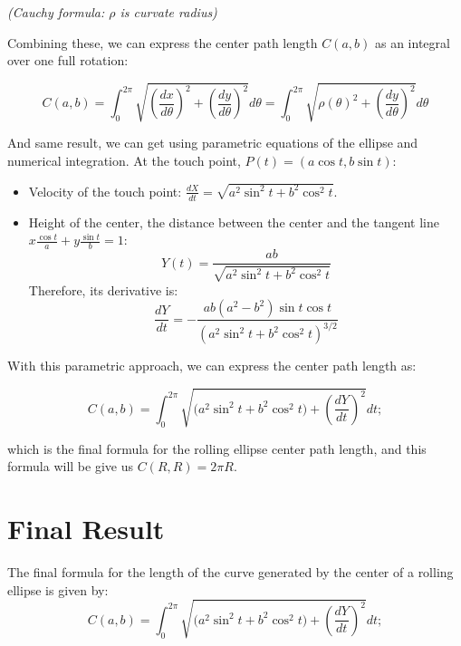 \documentclass[12pt]{article}
\theoremstyle{definition}
\begin{document}
\textit{(Cauchy formula: $\rho$ is curvate radius)}

Combining these, we can express the center path length $C(a,b)$ as an integral over one full rotation:

\[
    C(a,b)=\int_{0}^{2\pi}\sqrt{\left(\frac{dx}{d\theta}\right)^2+\left(\frac{dy}{d\theta}\right)^2}d\theta=\int_{0}^{2\pi}\sqrt{\rho(\theta)^2+\left(\frac{dy}{d\theta}\right)^2}d\theta
\]

And same result, we can get using parametric equations of the ellipse and numerical integration. At the touch point, $P(t) = (a\cos t, b\sin t)$:
\begin{itemize}
    \item Velocity of the touch point: $\frac{dX}{dt}= \sqrt{a^2\sin^2t + b^2 \cos^2t}$.
    \item Height of the center, the distance between the center and the tangent line $x\frac{\cos t}{a}+y\frac{\sin t}{b}=1$:
          \[
              Y(t) = \frac{ab}{\sqrt{a^2\sin^2t + b^2 \cos^2t}}
          \]
          Therefore, its derivative is:
          \[
              \frac{dY}{dt} = -\frac{ab(a^2-b^2)\sin t \cos t}{(a^2\sin^2t + b^2 \cos^2t)^{3/2}}
          \]
\end{itemize}

With this parametric approach, we can express the center path length as:

\[
    C(a,b)=\int_{0}^{2\pi}\sqrt{\big(a^2\sin^2 t+b^2\cos^2 t\big)
        +\left(\frac{dY}{dt}\right)^2}dt ;
\]

which is the final formula for the rolling ellipse center path length, and this formula will be give us $C(R,R)=2 \pi R$.

\section{Final Result}
The final formula for the length of the curve generated by the center of a rolling ellipse is given by:
\[
    \boxed{C(a,b)=\int_{0}^{2\pi}\sqrt{\big(a^2\sin^2 t+b^2\cos^2 t\big)
            +\left(\frac{dY}{dt}\right)^2}dt ;}
\]
\end{document}
